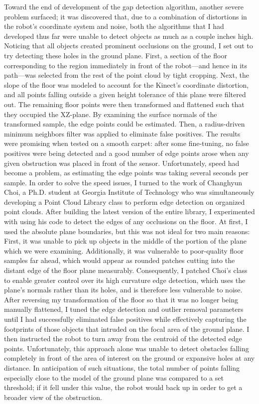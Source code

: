 \documentclass[12pt]{report}
\begin{document}
Toward the end of development of the gap detection algorithm, another severe problem surfaced; it was discovered that, due to a combination of distortions in the robot's coordinate system and noise, both the algorithms that I had developed thus far were unable to detect objects as much as a couple inches high.  Noticing that all objects created prominent occlusions on the ground, I set out to try detecting these holes in the ground plane.  First, a section of the floor corresponding to the region immediately in front of the robot---and hence in its path---was selected from the rest of the point cloud by tight cropping.  Next, the slope of the floor was modeled to account for the Kinect's coordinate distortion, and all points falling outside a given height tolerance of this plane were filtered out.  The remaining floor points were then transformed and flattened such that they occupied the XZ-plane.  By examining the surface normals of the transformed sample, the edge points could be estimated.  Then, a radius-driven minimum neighbors filter was applied to eliminate false positives.  The results were promising when tested on a smooth carpet: after some fine-tuning, no false positives were being detected and a good number of edge points arose when any given obstruction was placed in front of the sensor.  Unfortunately, speed had become a problem, as estimating the edge points was taking several seconds per sample.
In order to solve the speed issues, I turned to the work of Changhyun Choi, a Ph.D. student at Georgia Institute of Technology who was simultaneously developing a Point Cloud Library class to perform edge detection on organized point clouds.  After building the latest version of the entire library, I experimented with using his code to detect the edges of any occlusions on the floor.  At first, I used the absolute plane boundaries, but this was not ideal for two main reasons:  First, it was unable to pick up objects in the middle of the portion of the plane which we were examining.  Additionally, it was vulnerable to poor-quality floor samples far ahead, which would appear as rounded patches cutting into the distant edge of the floor plane measurably.  Consequently, I patched Choi's class to enable greater control over its high curvature edge detection, which uses the plane's normals rather than its holes, and is therefore less vulnerable to noise.  After reversing my transformation of the floor so that it was no longer being manually flattened, I tuned the edge detection and outlier removal parameters until I had successfully eliminated false positives while effectively capturing the footprints of those objects that intruded on the focal area of the ground plane.  I then instructed the robot to turn away from the centroid of the detected edge points.
Unfortunately, this approach alone was unable to detect obstacles falling completely in front of the area of interest on the ground or expansive holes at any distance.  In anticipation of such situations, the total number of points falling especially close to the model of the ground plane was compared to a set threshold; if it fell under this value, the robot would back up in order to get a broader view of the obstruction.
\end{document}

